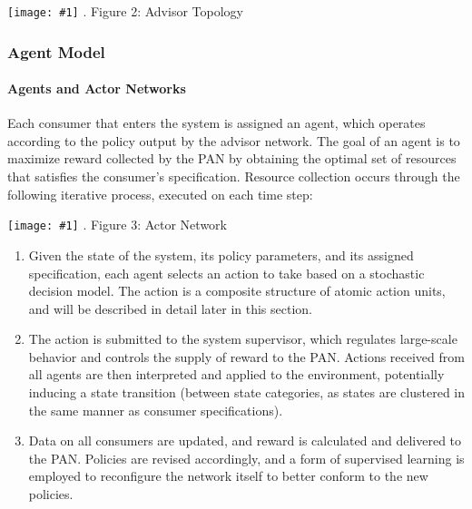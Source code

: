 \documentclass{article}
\theoremstyle{definition}
\theoremstyle{remark}
\newcommand{\addpic}[1]{\texttt{[image: \#1]}}
\begin{document}
				\addpic{figures/advisor_topology.png}
		 		.\hspace{3 cm}  Figure 2:  Advisor Topology	

		\subsubsection{Agent Model}
		
			\paragraph{Agents and Actor Networks}

			Each consumer that enters the system is assigned an agent, which operates according to the policy output by the advisor network. The goal of an agent is to maximize reward collected by the PAN by obtaining the optimal set of resources that satisfies the consumer's specification. Resource collection occurs through the following iterative process, executed on each time step:
			
			\addpic{figures/actor_network}
			.\hspace{3.5cm}  Figure 3:  Actor Network
			
			\begin{enumerate}

				\item Given the state of the system, its policy parameters, and its assigned specification, each agent selects an action to take based on a stochastic decision model. The action is a composite structure of atomic action units, and will be described in detail later in this section.

				\item The action is submitted to the system supervisor, which regulates large-scale behavior and controls the supply of reward to the PAN. Actions received from all agents are then interpreted and applied to the environment, potentially inducing a state transition (between state categories, as states are clustered in the same manner as consumer specifications).

				\item Data on all consumers are updated, and reward is calculated and delivered to the PAN. Policies are revised accordingly, and a form of supervised learning is employed to reconfigure the network itself to better conform to the new policies.

			\end{enumerate}
\end{document}
